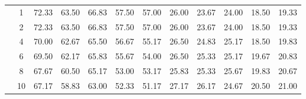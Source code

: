 \begin{table}[htpb]
\begin{tabular}{|c|c|c c c c c|c c c c c|}
\multicolumn{1}{|c|}{ \multirow{6}{*}{\rotatebox[origin=c]{90}{\textbf{K-vizinhos}}} }
&1	&72.33	&63.50	&66.83	&57.50	&57.00	&26.00	&23.67	&24.00	&18.50	&19.33\\\cline{2-12}
&2	&72.33	&63.50	&66.83	&57.50	&57.00	&26.00	&23.67	&24.00	&18.50	&19.33\\\cline{2-12}
&4	&70.00	&62.67	&65.50	&56.67	&55.17	&26.50	&24.83	&25.17	&18.50	&19.83\\\cline{2-12}
&6	&69.50	&62.17	&65.83	&55.67	&54.00	&26.50	&25.33	&25.17	&19.67	&20.83\\\cline{2-12}
&8	&67.67	&60.50	&65.17	&53.00	&53.17	&25.83	&25.33	&25.67	&19.83	&20.67\\\cline{2-12}
&10	&67.17	&58.83	&63.00	&52.33	&51.17	&27.17	&26.17	&24.67	&20.50	&21.00\\\midrule

	\end{tabular}
\end{table}






